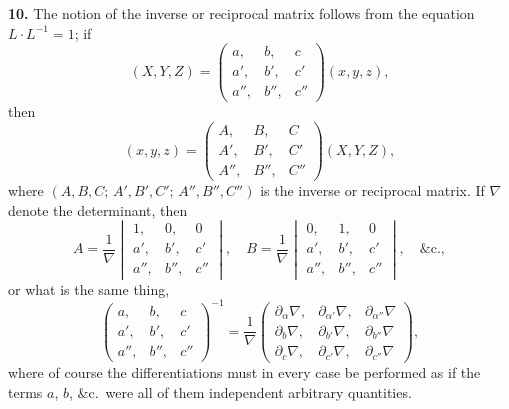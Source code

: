 \documentclass[11pt,a4paper]{book}
\begin{document}
\begin{center}
\medskip
\noindent\textbf{10.} The notion of the inverse or reciprocal matrix follows from the equation $L \cdot L^{-1} = 1$; if
\[
(X,Y,Z) = \begin{pmatrix} a, & b, & c \\ a', & b', & c' \\ a'', & b'', & c'' \end{pmatrix}(x,y,z),
\]
then
\[
(x,y,z) = \begin{pmatrix} A, & B, & C \\ A', & B', & C' \\ A'', & B'', & C'' \end{pmatrix}(X,Y,Z),
\]
where $(A,B,C;\, A',B',C';\, A'',B'',C'')$ is the inverse or reciprocal matrix. If $\nabla$ denote the determinant, then
\[
A = \frac{1}{\nabla}\begin{vmatrix} 1, & 0, & 0 \\ a', & b', & c' \\ a'', & b'', & c'' \end{vmatrix},\quad
B = \frac{1}{\nabla}\begin{vmatrix} 0, & 1, & 0 \\ a', & b', & c' \\ a'', & b'', & c'' \end{vmatrix},\quad \&\text{c.},
\]
or what is the same thing,
\[
\begin{pmatrix} a, & b, & c \\ a', & b', & c' \\ a'', & b'', & c'' \end{pmatrix}^{-1}
= \frac{1}{\nabla}
\begin{pmatrix}
\partial_\alpha \nabla, & \partial_{\alpha'} \nabla, & \partial_{\alpha''} \nabla \\
\partial_b \nabla, & \partial_{b'} \nabla, & \partial_{b''} \nabla \\
\partial_c \nabla, & \partial_{c'} \nabla, & \partial_{c''} \nabla
\end{pmatrix},
\]
where of course the differentiations must in every case be performed as if the terms $a$, $b$, \&c.\ were all of them independent arbitrary quantities.

\newpage


\end{center}
\end{document}
